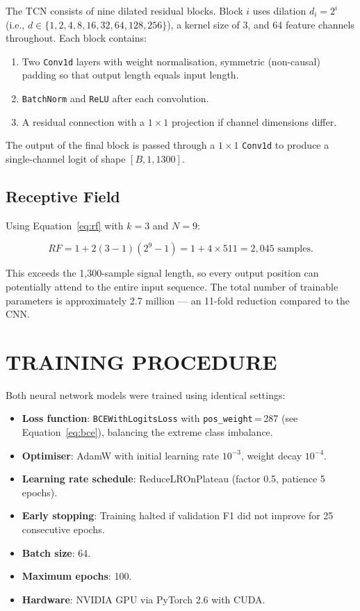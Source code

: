 The TCN \cite{Bai2018} consists of nine dilated residual blocks. Block $i$ uses
dilation $d_i = 2^{i}$ (i.e., $d \in \{1, 2, 4, 8, 16, 32, 64, 128, 256\}$),
a kernel size of 3, and 64 feature channels throughout. Each block contains:

\begin{enumerate}
    \item Two \texttt{Conv1d} layers with weight normalisation, symmetric
          (non-causal) padding so that output length equals input length.
    \item \texttt{BatchNorm} and \texttt{ReLU} after each convolution.
    \item A residual connection with a $1{\times}1$ projection if channel
          dimensions differ.
\end{enumerate}

The output of the final block is passed through a $1{\times}1$ \texttt{Conv1d}
to produce a single-channel logit of shape $[B, 1, 1300]$.

\subsection{Receptive Field}

Using Equation~\ref{eq:rf} with $k=3$ and $N=9$:

\begin{equation}
    RF = 1 + 2(3-1)(2^{9}-1) = 1 + 4 \times 511 = 2{,}045 \text{ samples}.
\end{equation}

This exceeds the 1,300-sample signal length, so every output position can
potentially attend to the entire input sequence. The total number of trainable
parameters is approximately 2.7 million --- an 11-fold reduction compared to
the CNN.

\section{TRAINING PROCEDURE}

Both neural network models were trained using identical settings:

\begin{itemize}
    \item \textbf{Loss function}: \texttt{BCEWithLogitsLoss} with
          \texttt{pos\_weight}\,=\,287 (see Equation~\ref{eq:bce}), balancing the
          extreme class imbalance.
    \item \textbf{Optimiser}: AdamW \cite{Paszke2019} with initial learning rate
          $10^{-3}$, weight decay $10^{-4}$.
    \item \textbf{Learning rate schedule}: ReduceLROnPlateau (factor 0.5,
          patience 5 epochs).
    \item \textbf{Early stopping}: Training halted if validation F1 did not
          improve for 25 consecutive epochs.
    \item \textbf{Batch size}: 64.
    \item \textbf{Maximum epochs}: 100.
    \item \textbf{Hardware}: NVIDIA GPU via PyTorch 2.6 with CUDA.
\end{itemize}

